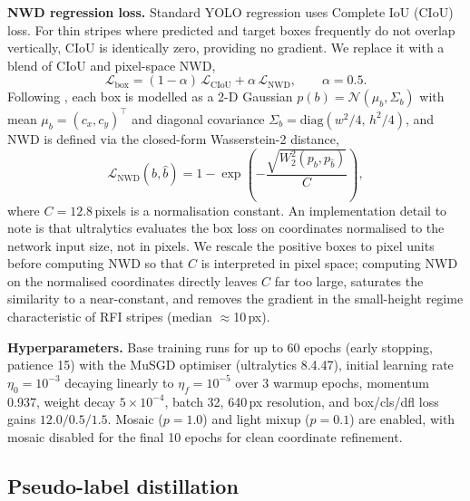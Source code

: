 \documentclass{article}
\begin{document}
\textbf{NWD regression loss.} Standard YOLO regression uses Complete
IoU (CIoU) \cite{zheng2020ciou} loss. For thin stripes where predicted
and target boxes frequently do not overlap vertically, CIoU is
identically zero, providing no gradient. We replace it with a blend of
CIoU and pixel-space NWD,
\begin{equation}
  \mathcal{L}_{\mathrm{box}} = (1-\alpha)\,\mathcal{L}_{\mathrm{CIoU}}
   + \alpha\,\mathcal{L}_{\mathrm{NWD}},\qquad \alpha=0.5.
\end{equation}
Following \cite{wang2021nwd}, each box is modelled as a 2-D Gaussian
$p(b)=\mathcal{N}(\mu_b,\Sigma_b)$ with mean $\mu_b=(c_x,c_y)^\top$ and
diagonal covariance $\Sigma_b=\mathrm{diag}(w^2/4,\,h^2/4)$, and NWD is
defined via the closed-form Wasserstein-2 distance,
\begin{equation}
  \mathcal{L}_{\mathrm{NWD}}(b,\hat b)
   = 1 - \exp\!\left(-\frac{\sqrt{W_2^2(p_b,p_{\hat b})}}{C}\right),
\end{equation}
where $C=12.8$\,pixels is a normalisation constant. An implementation
detail to note is that ultralytics evaluates the box loss on
coordinates normalised to the network input size, not in pixels. We
rescale the positive boxes to pixel units before computing NWD so that
$C$ is interpreted in pixel space; computing NWD on the normalised
coordinates directly leaves $C$ far too large, saturates the
similarity to a near-constant, and removes the gradient in the
small-height regime characteristic of RFI stripes (median
$\approx$10\,px).

\textbf{Hyperparameters.} Base training runs for up to 60 epochs
(early stopping, patience 15) with the MuSGD optimiser (ultralytics
8.4.47), initial learning rate $\eta_0{=}10^{-3}$ decaying linearly to
$\eta_f{=}10^{-5}$ over 3 warmup epochs, momentum 0.937, weight decay
$5{\times}10^{-4}$, batch 32, 640\,px resolution, and box/cls/dfl loss
gains $12.0/0.5/1.5$. Mosaic ($p{=}1.0$) and light mixup ($p{=}0.1$)
are enabled, with mosaic disabled for the final 10 epochs for clean
coordinate refinement.

\subsection{Pseudo-label distillation}
\label{sec:pseudo}
\end{document}
